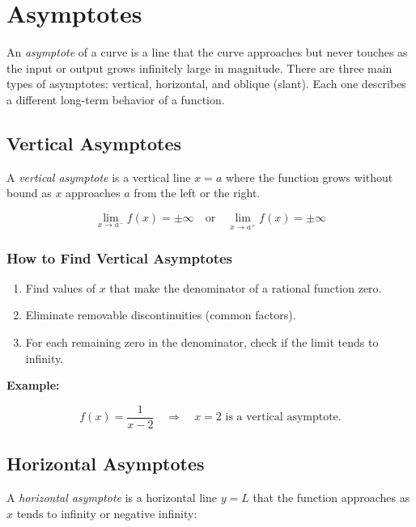 \chapter{Asymptotes}

An \emph{asymptote} of a curve is a line that the curve approaches but never touches as the input 
or output grows infinitely large in magnitude. There are three main types of asymptotes: vertical, 
horizontal, and oblique (slant). Each one describes a different long-term behavior of a function.

\section{Vertical Asymptotes}

A \emph{vertical asymptote} is a vertical line \(x = a\) where the function grows without bound 
as \(x\) approaches \(a\) from the left or the right.

\[
    \lim_{x \to a^-} f(x) = \pm \infty \quad \text{or} \quad \lim_{x \to a^+} f(x) = \pm \infty
\]

\subsection{How to Find Vertical Asymptotes}

\begin{enumerate}

    \item Find values of \(x\) that make the denominator of a rational function zero.

    \item Eliminate removable discontinuities (common factors).

    \item For each remaining zero in the denominator, check if the limit tends to infinity.

\end{enumerate}

\textbf{Example:}

\[
    f(x) = \frac{1}{x - 2} \quad \Rightarrow \quad x = 2 \text{ is a vertical asymptote.}
\]

\section{Horizontal Asymptotes}

A \emph{horizontal asymptote} is a horizontal line \(y = L\) that the function approaches as \(x\) 
tends to infinity or negative infinity:

